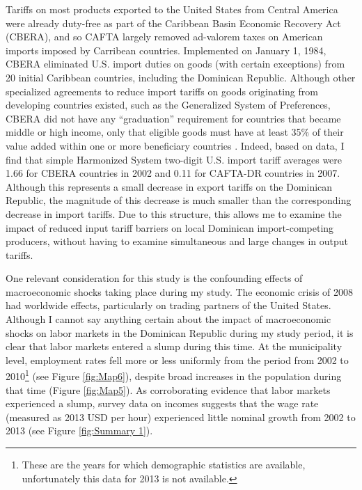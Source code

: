 \documentclass[12pt]{article}
\begin{document}
Tariffs on most products exported to the United States from Central America were 
already duty-free as part of the Caribbean Basin Economic Recovery Act (CBERA), and so CAFTA largely 
removed ad-valorem taxes on American imports imposed by Carribean countries. 
Implemented on January 1, 1984, CBERA eliminated U.S. import duties on goods (with certain
exceptions) from 20 initial Caribbean countries, including the Dominican Republic.
Although other specialized agreements to reduce import tariffs on goods originating from developing 
countries existed, such as the Generalized System of Preferences, CBERA did not have any ``graduation''
requirement for countries that became middle or high income, only that eligible  
goods must have at least 35\% of their value added within one or more beneficiary countries 
\citep{pelzman}. Indeed, based on \citeauthor{wtotariff} data, I find that simple Harmonized
System two-digit U.S. import tariff averages were 1.66 for CBERA countries in 2002 and 0.11 for 
CAFTA-DR countries in 2007. Although this represents a small decrease in export tariffs on
the Dominican Republic, the magnitude of this decrease is much smaller than the corresponding
decrease in import tariffs. Due to this structure, this allows me to examine the impact of reduced 
input tariff barriers on local Dominican import-competing producers, without having to 
examine simultaneous and large changes in output tariffs.

One relevant consideration for this study is the confounding effects of macroeconomic shocks 
taking place during my study. The economic crisis of 2008 had worldwide effects, particularly
on trading partners of the United States. Although I cannot say anything certain about the impact
of macroeconomic shocks on labor markets in the Dominican Republic during my study period, 
it is clear that labor markets entered a slump during this time. At the municipality level, employment
rates fell more or less uniformly from the period from 2002 to 2010\footnote{These are the years for
which demographic statistics are available, unfortunately this data for 2013 is not available.} (see
Figure \ref{fig:Map6}), despite broad increases in the population during that time (Figure \ref{fig:Map5}).
As corroborating evidence that labor markets experienced a slump, survey data on incomes suggests
that the wage rate (measured as 2013 USD per hour) experienced little nominal growth from 
2002 to 2013 (see Figure \ref{fig:Summary 1}).

\vspace{-10pt}
\end{document}

